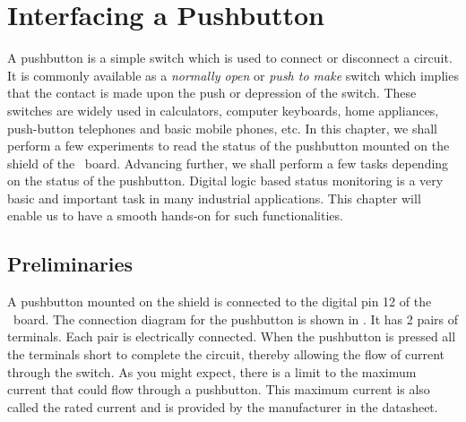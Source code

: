 \chapter{Interfacing a Pushbutton}
\thispagestyle{empty}
\label{pushbutton}

\newcommand{\LocPushfig}{\Origin/user-code/push/figures}
\newcommand{\LocPushscicode}{\Origin/user-code/push/scilab}
\newcommand{\LocPushscibrief}[1]{{\tt
    \seqsplit{Origin/user-code/push/scilab/#1}}, 
see \fnrefp{fn:file-loc}}
\newcommand{\LocPushardcode}{\Origin/user-code/push/arduino}
\newcommand{\LocPushardbrief}[1]{{\tt
    \seqsplit{Origin/user-code/push/arduino/#1}}, 
see \fnrefp{fn:file-loc}}


\newcommand{\LocPushpycode}{\Origin/user-code/push/python}
\newcommand{\LocPushpybrief}[1]{{\tt
    \seqsplit{Origin/user-code/push/python/#1}}, 
see \fnrefp{fn:file-loc}}

\newcommand{\LocPushjuliacode}{\Origin/user-code/push/julia}
\newcommand{\LocPushjuliabrief}[1]{{\tt
    \seqsplit{Origin/user-code/push/julia/#1}}, 
see \fnrefp{fn:file-loc}}


\newcommand{\LocPushOpenModelicacode}{\Origin/user-code/push/OpenModelica}  %
\newcommand{\LocPushOpenModelicabrief}[1]{{\tt \seqsplit{%
    Origin/user-code/led/OpenModelica/#1}}, see \fnrefp{fn:file-loc}} %

A pushbutton is a simple switch which is used to connect or disconnect
a circuit. It is commonly available as a \emph{normally open} or
\emph{push to make} switch which implies that the contact is made upon
the push or depression of the switch. These switches are widely used
in calculators, computer keyboards, home appliances, push-button
telephones and basic mobile phones, etc. In this chapter, we shall
perform a few experiments to read the status of the pushbutton mounted
on the shield of the \arduino\ board. Advancing further, we shall
perform a few tasks depending on the status of the pushbutton. Digital
logic based status monitoring is a very basic and important task in
many industrial applications. This chapter will enable us to have a
smooth hands-on for such functionalities. 

\section{Preliminaries}
A pushbutton mounted on the shield is connected to the digital pin 12
of the \arduino\ board. The connection diagram for the pushbutton is
shown in . It has 2 pairs of
terminals. Each pair is electrically connected. When the pushbutton is
pressed all the terminals short to complete the circuit, thereby
allowing the flow of current through the switch. As you might expect,
there is a limit to the maximum current that could flow through a
pushbutton. This maximum current is also called the rated current and
is provided by the manufacturer in the datasheet.  

